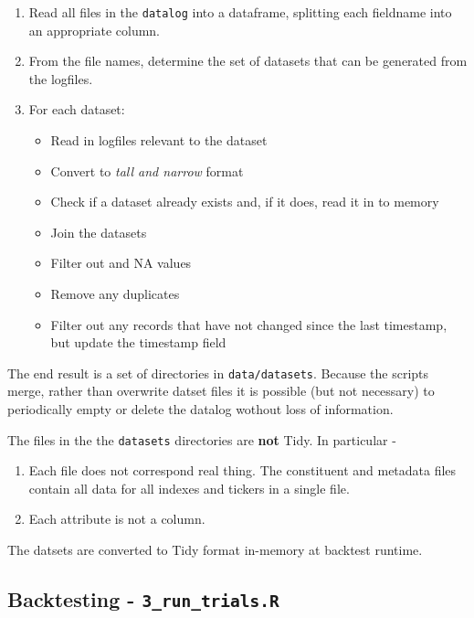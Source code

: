 \documentclass[11pt,preprint, authoryear]{elsarticle}
\numberwithin{equation}{section}
\numberwithin{figure}{section}
\numberwithin{table}{section}
\def\tightlist{} %
\begin{document}
\begin{enumerate}
\def\labelenumi{\arabic{enumi}.}
\tightlist
\item
  Read all files in the \texttt{datalog} into a dataframe, splitting
  each fieldname into an appropriate column.
\item
  From the file names, determine the set of datasets that can be
  generated from the logfiles.
\item
  For each dataset:

  \begin{itemize}
  \tightlist
  \item
    Read in logfiles relevant to the dataset
  \item
    Convert to \emph{tall and narrow} format
  \item
    Check if a dataset already exists and, if it does, read it in to
    memory
  \item
    Join the datasets
  \item
    Filter out and NA values
  \item
    Remove any duplicates
  \item
    Filter out any records that have not changed since the last
    timestamp, but update the timestamp field
  \end{itemize}
\end{enumerate}

The end result is a set of directories in \texttt{data/datasets}.
Because the scripts merge, rather than overwrite datset files it is
possible (but not necessary) to periodically empty or delete the datalog
wothout loss of information.

The files in the the \texttt{datasets} directories are \textbf{not}
Tidy. In particular -

\begin{enumerate}
\def\labelenumi{\arabic{enumi}.}
\tightlist
\item
  Each file does not correspond real thing. The constituent and metadata
  files contain all data for all indexes and tickers in a single file.
\item
  Each attribute is not a column.
\end{enumerate}

The datsets are converted to Tidy format in-memory at backtest runtime.

\newpage

\subsection{\texorpdfstring{Backtesting -
\texttt{3\_run\_trials.R}}{Backtesting - 3\_run\_trials.R}}\label{backtesting---3_run_trials.r}
\end{document}
